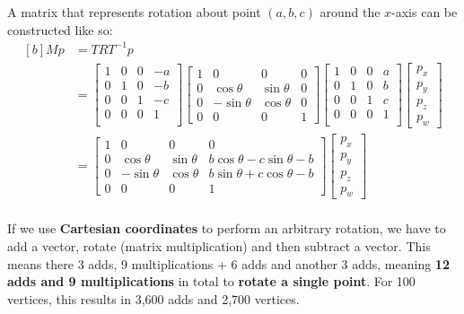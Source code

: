 \documentclass{article}
\begin{document}
A matrix that represents rotation about point $(a, b, c)$ around the $x$-axis can be constructed like so:
\begin{equation}
\begin{aligned}[b]
	Mp &= TRT^{-1}p \\
	&= 	\left[ \begin{matrix}
	1 & 0 & 0 & -a \\
	0 & 1 & 0 & -b \\
	0 & 0 & 1 & -c \\
	0 & 0 & 0 & 1 \\
	\end{matrix} \right]
	\left[ \begin{matrix}
	1 & 0 & 0 & 0 \\
	0 & \cos \theta & \sin \theta & 0\\
	0 & -\sin \theta & \cos \theta & 0 \\
	0 & 0 & 0 & 1
	\end{matrix} \right]
	\left[ \begin{matrix}
	1 & 0 & 0 & a \\
	0 & 1 & 0 & b \\
	0 & 0 & 1 & c \\
	0 & 0 & 0 & 1 \\
	\end{matrix} \right]
	\left[ \begin{matrix}
	p_x \\ p_y \\ p_z \\ p_w
	\end{matrix} \right] \\
	&= 	\left[ \begin{matrix}
	1 & 0 & 0 & 0 \\
	0 & \cos \theta & \sin \theta & b \cos \theta - c \sin \theta - b \\
	0 & -\sin \theta & \cos \theta & b \sin \theta + c \cos \theta - b \\
	0 & 0 & 0 & 1
	\end{matrix} \right] 
	\left[ \begin{matrix}
	p_x \\ p_y \\ p_z \\ p_w
	\end{matrix} \right] \\	
\end{aligned}
\label{eq:matrix-composition}
\end{equation}

If we use \textbf{Cartesian coordinates} to perform an arbitrary rotation, we have to add a vector, rotate (matrix multiplication) and then subtract a vector. This means there 3 adds, 9 multiplications + 6 adds and another 3 adds, meaning \textbf{12 adds and 9 multiplications} in total to \textbf{rotate a single point}. For 100 vertices, this results in 3,600 adds and 2,700 vertices.
\end{document}
